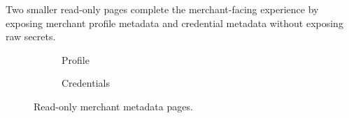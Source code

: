 Two smaller read-only pages complete the merchant-facing experience by exposing
merchant profile metadata and credential metadata without exposing raw secrets.

\begin{figure}[!htbp]
\centering
\begin{subfigure}{0.48\textwidth}
  \centering
  \caption{Profile}
\end{subfigure}
\hfill
\begin{subfigure}{0.48\textwidth}
  \centering
  \caption{Credentials}
\end{subfigure}
\caption{Read-only merchant metadata pages.}
\end{figure}
